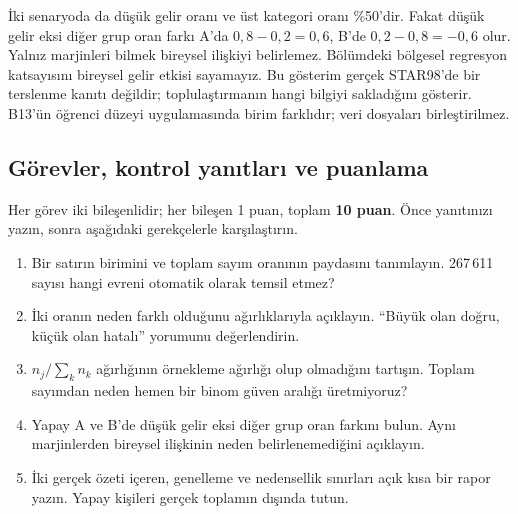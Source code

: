 İki senaryoda da düşük gelir oranı ve üst kategori oranı \%50'dir. Fakat
düşük gelir eksi diğer grup oran farkı A'da $0{,}8-0{,}2=0{,}6$,
B'de $0{,}2-0{,}8=-0{,}6$ olur. Yalnız marjinleri bilmek bireysel
ilişkiyi belirlemez. Bölümdeki bölgesel regresyon katsayısını bireysel gelir
etkisi sayamayız. Bu gösterim gerçek STAR98'de bir terslenme kanıtı değildir;
toplulaştırmanın hangi bilgiyi sakladığını gösterir. B13'ün öğrenci düzeyi
uygulamasında birim farklıdır; veri dosyaları birleştirilmez.

\subsection{Görevler, kontrol yanıtları ve puanlama}

Her görev iki bileşenlidir; her bileşen 1 puan, toplam \textbf{10 puan}.
Önce yanıtınızı yazın, sonra aşağıdaki gerekçelerle karşılaştırın.
\begin{enumerate}
\item Bir satırın birimini ve toplam sayım oranının paydasını tanımlayın.
  267\,611 sayısı hangi evreni otomatik olarak temsil etmez?
\item İki oranın neden farklı olduğunu ağırlıklarıyla açıklayın.
  ``Büyük olan doğru, küçük olan hatalı'' yorumunu değerlendirin.
\item $n_j/\sum_k n_k$ ağırlığının örnekleme ağırlığı olup olmadığını
  tartışın. Toplam sayımdan neden hemen bir binom güven aralığı üretmiyoruz?
\item Yapay A ve B'de düşük gelir eksi diğer grup oran farkını bulun.
  Aynı marjinlerden bireysel ilişkinin neden belirlenemediğini açıklayın.
\item İki gerçek özeti içeren, genelleme ve nedensellik sınırları açık
  kısa bir rapor yazın. Yapay kişileri gerçek toplamın dışında tutun.
\end{enumerate}

